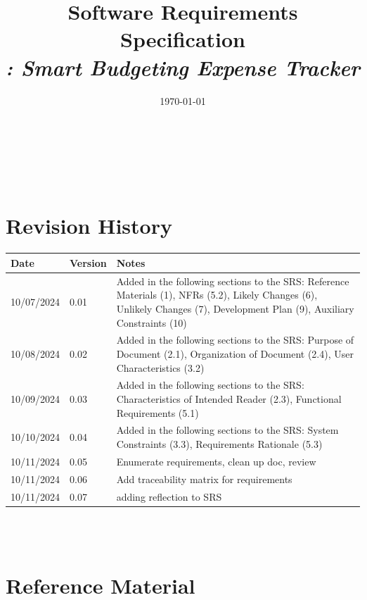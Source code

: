 \documentclass[12pt]{article}
\begin{document}
\title{Software Requirements Specification \\ \textit{\progname: Smart Budgeting Expense Tracker}} 
\author{\authname}
\date{\today}
	
\maketitle

~\newpage


\tableofcontents

~\newpage

\section*{Revision History}

\begin{tabularx}{\textwidth}{p{3cm}p{2cm}X}
\toprule {\bf Date} & {\bf Version} & {\bf Notes}\\
\midrule
10/07/2024 & 0.01 & Added in the following sections to the SRS: Reference Materials (1), NFRs (5.2), Likely Changes (6), Unlikely Changes (7), Development Plan (9), Auxiliary Constraints (10)\\
10/08/2024 & 0.02 & Added in the following sections to the SRS: Purpose of Document (2.1), Organization of Document (2.4), User Characteristics (3.2)\\
10/09/2024 & 0.03 & Added in the following sections to the SRS: Characteristics of Intended Reader (2.3), Functional Requirements (5.1)\\
10/10/2024 & 0.04 & Added in the following sections to the SRS: System Constraints (3.3), Requirements Rationale (5.3)\\
10/11/2024 & 0.05 & Enumerate requirements, clean up doc, review\\
10/11/2024 & 0.06 & Add traceability matrix for requirements\\
10/11/2024 & 0.07 & adding reflection to SRS\\
\bottomrule 
\end{tabularx}

~\\


~\newpage

\section{Reference Material}
\end{document}
